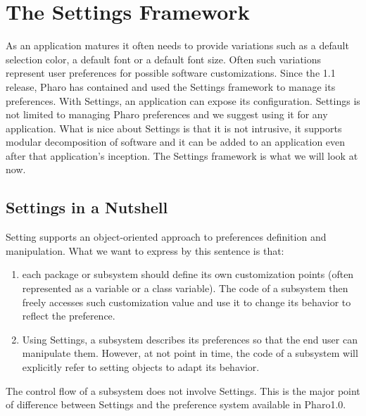 \documentclass[a4paper,10pt,twoside]{book}
\begin{document}
\fi
\sloppy
\newcommand{\apl}[1]{\nnbb{Alain}{#1}} %
\newcommand{\setbrowser}{\textit{Settings Browser}\xspace}

\chapter{The Settings Framework}

As an application matures it often needs to provide variations such as
a default selection color, a default font or a default font size.
Often such variations represent user preferences for possible software
customizations. Since the 1.1 release, Pharo has contained and used
the Settings framework to manage its preferences. With Settings, an
application can expose its configuration. Settings is not limited to
managing Pharo preferences and we suggest using it for any
application. What is nice about Settings is that it is not intrusive,
it supports modular decomposition of software and it can be added to
an application even after that application's inception. The Settings
framework is what we will look at now.

\section{Settings in a Nutshell}

Setting supports an object-oriented approach to preferences definition and manipulation. What we want to express by this sentence is that:
\begin{enumerate}
\item each package or subsystem should define its own customization points (often represented as a variable or a class variable). The code of a subsystem then freely accesses such customization value and use it to change its behavior to reflect the preference.
\item Using Settings, a subsystem describes its preferences so that the end user can manipulate them. However, at not point in time, the code of a subsystem will explicitly refer to setting objects to adapt its behavior. 
\end{enumerate}

The control flow of a subsystem does not involve Settings. This is the major point of difference between Settings and the preference system available in Pharo1.0.
\end{document}
